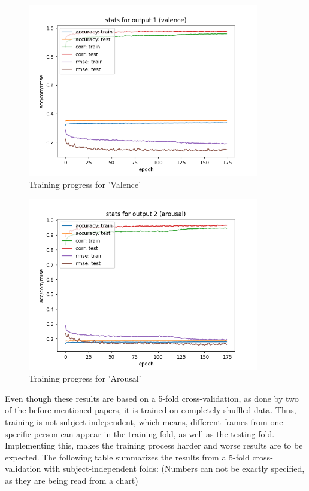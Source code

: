 \begin{figure}[H]
  \begin{center}
  \includegraphics[angle=0, width=0.9\textwidth]{Figures/output1.png}
  \caption{Training progress for 'Valence'}
  \label{fig:TrainingProgressValence}
  \end{center}
\end{figure}

\begin{figure}[H]
  \begin{center}
  \includegraphics[angle=0, width=0.9\textwidth]{Figures/output2.png}
  \caption{Training progress for 'Arousal'}
  \label{fig:TrainingProgressArousal}
  \end{center}
\end{figure}

Even though these results are based on a 5-fold cross-validation, as done by two of the before mentioned papers, it is trained on completely shuffled data. Thus, training is not subject independent, which means, different frames from one specific person can appear in the training fold, as well as the testing fold. Implementing this, makes the training process harder and worse results are to be expected.
\newline\newline
The following table summarizes the results from a 5-fold cross-validation with subject-independent folds:
(Numbers can not be exactly specified, as they are being read from a chart)

